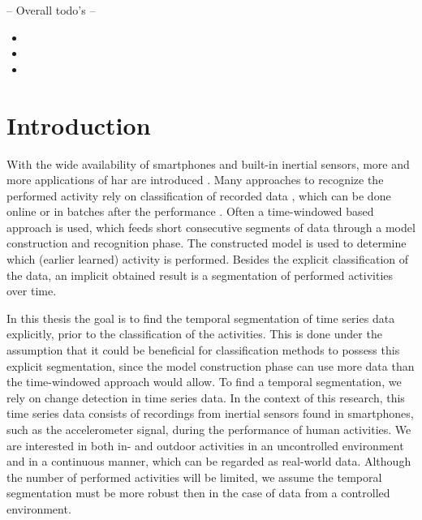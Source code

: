 
-- Overall todo's --
\begin{itemize}
  \item {}
  \item {}
  \item {}
\end{itemize}

\chapter{Introduction}

\label{Chapter1} %


With the wide availability of smartphones and built-in inertial sensors, more and more applications of \gls{har} are introduced \cite{avci2010activity,derawi2010accelerometer,guenterberg2009distributed}.
Many approaches to recognize the performed activity rely on classification of recorded data \cite{devaul2001real,ward2006activity,yang2008using,anguita2012human,bao2004activity,bernecker2012activity,he2008activity}, which can be done online or in batches after the performance \cite{duque2012offline}.
Often a time-windowed based approach is used, which feeds short consecutive segments of data through a model construction and recognition phase.
The constructed model is used to determine which (earlier learned) activity is performed.
Besides the explicit classification of the data, an implicit obtained result is a segmentation of performed activities over time.

In this thesis the goal is to find the temporal segmentation of time series data explicitly, prior to the classification of the activities.
This is done under the assumption that it could be beneficial for classification methods to possess this explicit segmentation, since the model construction phase can use more data than the time-windowed approach would allow.
To find a temporal segmentation, we rely on change detection in time series data.
In the context of this research, this time series data consists of recordings from inertial sensors found in smartphones, such as the accelerometer signal, during the performance of human activities.
We are interested in both in- and outdoor activities in an uncontrolled environment and in a continuous manner, which can be regarded as real-world data.
Although the number of performed activities will be limited, we assume the temporal segmentation must be more robust then in the case of data from a controlled environment.

